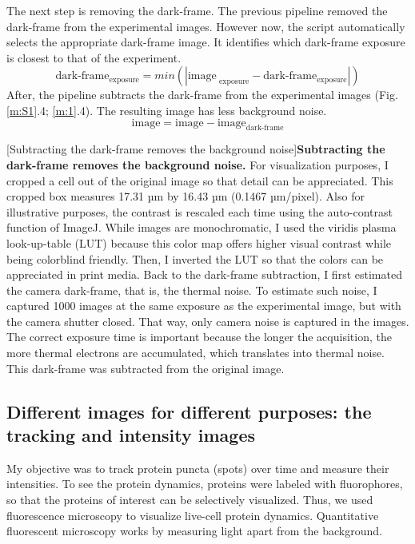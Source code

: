 The next step is removing the dark-frame. The previous pipeline removed the dark-frame from the experimental images. However now, the script automatically selects the appropriate dark-frame image. It identifies which dark-frame exposure is closest to that of the experiment. \begin{equation}\text{dark-frame}_{\text{exposure}} = min(|\text{image}_\text{ exposure} - \text{dark-frame}_{\text{exposure}}|)\end{equation} After, the pipeline subtracts the dark-frame from the experimental images (Fig. \ref{m:S1}.4; \ref{m:1}.4). The resulting image has less background noise. \begin{equation}\text{image} = \text{image} - \text{image}_\text{dark-frame}\end{equation}

\begin{centering}
\captionsetup{parbox=none}
[Subtracting the dark-frame removes the background noise]{\textbf{Subtracting the dark-frame removes the background noise.} For visualization purposes, I cropped a cell out of the original image so that detail can be appreciated. This cropped box measures 17.31 µm by 16.43 µm (0.1467 µm/pixel). Also for illustrative purposes, the contrast is rescaled each time using the auto-contrast function of ImageJ. While images are monochromatic, I used the viridis plasma look-up-table (LUT) because this color map offers higher visual contrast while being colorblind friendly. Then, I inverted the LUT so that the colors can be appreciated in print media. Back to the dark-frame subtraction, I first estimated the camera dark-frame, that is, the thermal noise. To estimate such noise, I captured 1000 images at the same exposure as the experimental image, but with the camera shutter closed. That way, only camera noise is captured in the images. The correct exposure time is important because the longer the acquisition, the more thermal electrons are accumulated, which translates into thermal noise. This dark-frame was subtracted from the original image.}
\label{m:S1}
\end{centering}

\subsection{Different images for different purposes: the tracking and intensity images}
My objective was to track protein puncta (spots) over time and measure their intensities. To see the protein dynamics, proteins were labeled with fluorophores, so that the proteins of interest can be selectively visualized. Thus, we used fluorescence microscopy to visualize live-cell protein dynamics. Quantitative fluorescent microscopy works by measuring light apart from the background.

